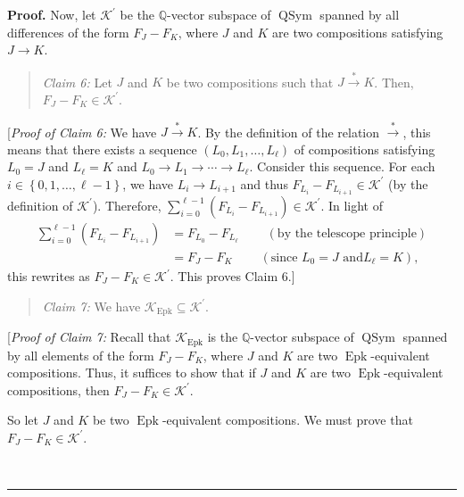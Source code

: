 \documentclass[numbers=enddot,12pt,final,onecolumn,notitlepage]{scrartcl}%
\theoremstyle{definition}
\newenvironment{statement}{\begin{quote}}{\end{quote}}
\newenvironment{proof}[1][Proof]{\noindent\textbf{#1.} }{\ \rule{0.5em}{0.5em}}
\let\sumnonlimits\sum
\renewcommand{\sum}{\sumnonlimits\limits}
\begin{document}
\begin{proof}
Now, let $\mathcal{K}^{\prime}$ be the $\mathbb{Q}$-vector subspace of
$\operatorname*{QSym}$ spanned by all differences of the form $F_{J}-F_{K}$,
where $J$ and $K$ are two compositions satisfying $J\rightarrow K$.

\begin{statement}
\textit{Claim 6:} Let $J$ and $K$ be two compositions such that
$J\overset{\ast}{\rightarrow}K$. Then, $F_{J}-F_{K}\in\mathcal{K}^{\prime}$.
\end{statement}

[\textit{Proof of Claim 6:} We have $J\overset{\ast}{\rightarrow}K$. By the
definition of the relation $\overset{\ast}{\rightarrow}$, this means that
there exists a sequence $\left(  L_{0},L_{1},\ldots,L_{\ell}\right)  $ of
compositions satisfying $L_{0}=J$ and $L_{\ell}=K$ and $L_{0}\rightarrow
L_{1}\rightarrow\cdots\rightarrow L_{\ell}$. Consider this sequence. For each
$i\in\left\{  0,1,\ldots,\ell-1\right\}  $, we have $L_{i}\rightarrow L_{i+1}$
and thus $F_{L_{i}}-F_{L_{i+1}}\in\mathcal{K}^{\prime}$ (by the definition of
$\mathcal{K}^{\prime}$). Therefore, $\sum_{i=0}^{\ell-1}\left(  F_{L_{i}%
}-F_{L_{i+1}}\right)  \in\mathcal{K}^{\prime}$. In light of%
\begin{align*}
\sum_{i=0}^{\ell-1}\left(  F_{L_{i}}-F_{L_{i+1}}\right)   &  =F_{L_{0}%
}-F_{L_{\ell}}\ \ \ \ \ \ \ \ \ \ \left(  \text{by the telescope
principle}\right) \\
&  =F_{J}-F_{K}\ \ \ \ \ \ \ \ \ \ \left(  \text{since }L_{0}=J\text{ and
}L_{\ell}=K\right)  ,
\end{align*}
this rewrites as $F_{J}-F_{K}\in\mathcal{K}^{\prime}$. This proves Claim 6.]

\begin{statement}
\textit{Claim 7:} We have $\mathcal{K}_{\operatorname*{Epk}}\subseteq
\mathcal{K}^{\prime}$.
\end{statement}

[\textit{Proof of Claim 7:} Recall that $\mathcal{K}_{\operatorname*{Epk}}$ is
the $\mathbb{Q}$-vector subspace of $\operatorname*{QSym}$ spanned by all
elements of the form $F_{J}-F_{K}$, where $J$ and $K$ are two
$\operatorname*{Epk}$-equivalent compositions. Thus, it suffices to show that
if $J$ and $K$ are two $\operatorname*{Epk}$-equivalent compositions, then
$F_{J}-F_{K}\in\mathcal{K}^{\prime}$.

So let $J$ and $K$ be two $\operatorname*{Epk}$-equivalent compositions. We
must prove that $F_{J}-F_{K}\in\mathcal{K}^{\prime}$.


\end{proof}
\end{document}
